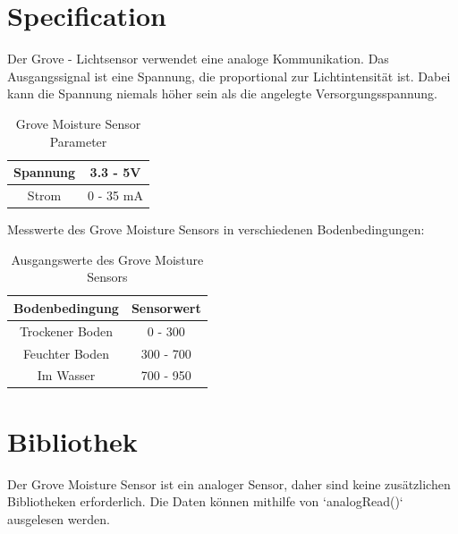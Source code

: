 \section{Specification}
Der Grove - Lichtsensor verwendet eine analoge Kommunikation. Das Ausgangssignal ist eine Spannung, die proportional zur Lichtintensität ist. Dabei kann die Spannung niemals höher sein als die angelegte Versorgungsspannung.

\begin{table}[H]
	\centering
	\begin{tabular}{|c|c|}
		\hline
		Spannung & 3.3 - 5V \\
		\hline
		Strom & 0 - 35 mA \\
		\hline
	\end{tabular}
	\caption{Grove Moisture Sensor Parameter}	%
\end{table}

Messwerte des Grove Moisture Sensors in verschiedenen Bodenbedingungen:
\begin{table}[H]
	\centering
	\begin{tabular}{|c|c|}
		\hline
		\textbf{Bodenbedingung} & \textbf{Sensorwert} \\
		\hline
		Trockener Boden & 0 - 300 \\
		\hline
		Feuchter Boden & 300 - 700 \\
		\hline
		Im Wasser & 700 - 950 \\
		\hline
	\end{tabular}
	\caption{Ausgangswerte des Grove Moisture Sensors}
\end{table}


\section{Bibliothek}
Der Grove Moisture Sensor ist ein analoger Sensor, daher sind keine zusätzlichen Bibliotheken erforderlich. Die Daten können mithilfe von `analogRead()` ausgelesen werden.




